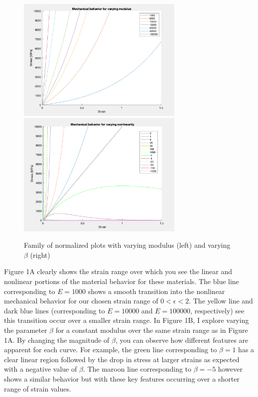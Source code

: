 \documentclass[12pt,american]{article}
\begin{document}
\begin{figure}
    \begin{center}
	\includegraphics[width= 8cm]{./Figures/nonlinear-varyingmod.png}
	\includegraphics[width= 8cm]{./Figures/modulus-varyingbeta.png}
	\caption{Family of normalized plots with varying modulus (left) and varying $\beta$ (right)}
	\end{center}
\end{figure}

\medskip 

Figure 1A clearly shows the strain range over which you see the linear and nonlinear portions of the material behavior for these materials. The blue line corresponding to $E=1000$ shows a smooth transition into the nonlinear mechanical behavior for our chosen strain range of $0<\epsilon<2$. The yellow line and dark blue lines (corresponding to $E = 10000$ and $E=100000$, respectively) see this transition occur over a smaller strain range. In Figure 1B, I explore varying the parameter $\beta$ for a constant modulus over the same strain range as in Figure 1A. By changing the magnitude of $\beta$, you can observe how different features are apparent for each curve. For example, the green line corresponding to $\beta=1$ has a clear linear region followed by the drop in stress at larger strains as expected with a negative value of $\beta$. The maroon line corresponding to $\beta=-5$ however shows a similar behavior but with these key features occurring over a shorter range of strain values.
\end{document}
